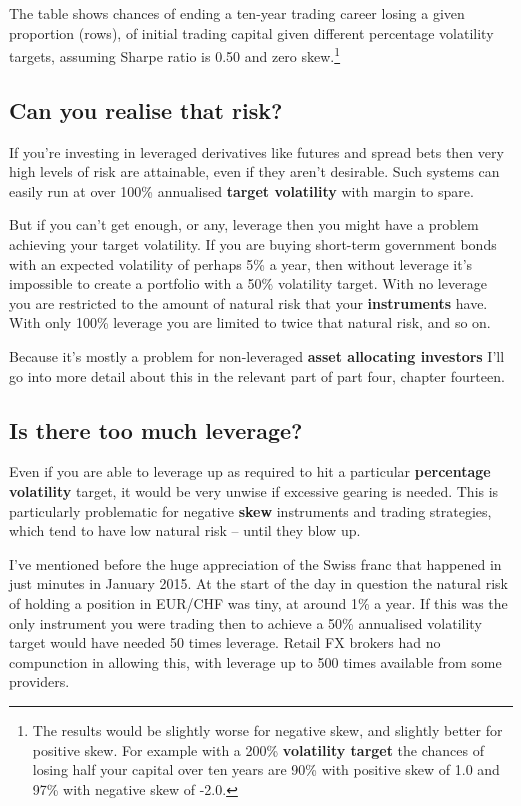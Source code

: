 The table shows chances of ending a ten-year trading career losing a given proportion (rows), of initial trading capital given different percentage volatility targets, assuming Sharpe ratio is 0.50 and zero skew.\footnote{The results would be slightly worse for negative skew, and slightly better for positive skew. For example with a 200\% \textbf{volatility target} the chances of losing half your capital over ten years are 90\% with positive skew of 1.0 and 97\% with negative skew of -2.0.}

\subsection*{Can you realise that risk?}

If you're investing in leveraged derivatives like futures and spread bets then very high levels of risk are attainable, even if they aren't desirable. Such systems can easily run at over 100\% annualised \textbf{target volatility} with margin to spare.

But if you can't get enough, or any, leverage then you might have a problem achieving your target volatility. If you are buying short-term government bonds with an expected volatility of perhaps 5\% a year, then without leverage it's impossible to create a portfolio with a 50\% volatility target. With no leverage you are restricted to the amount of natural risk that your \textbf{instruments} have. With only 100\% leverage you are limited to twice that natural risk, and so on.

Because it's mostly a problem for non-leveraged \textbf{asset allocating investors} I'll go into more detail about this in the relevant part of part four, chapter fourteen.

\subsection*{Is there too much leverage?}

Even if you are able to leverage up as required to hit a particular \textbf{percentage volatility} target, it would be very unwise if excessive gearing is needed. This is particularly problematic for negative \textbf{skew} instruments and trading strategies, which tend to have low natural risk -- until they blow up.

I've mentioned before the huge appreciation of the Swiss franc that happened in just minutes in January 2015. At the start of the day in question the natural risk of holding a position in EUR/CHF was tiny, at around 1\% a year. If this was the only instrument you were trading then to achieve a 50\% annualised volatility target would have needed 50 times leverage. Retail FX brokers had no compunction in allowing this, with leverage up to 500 times available from some providers.

